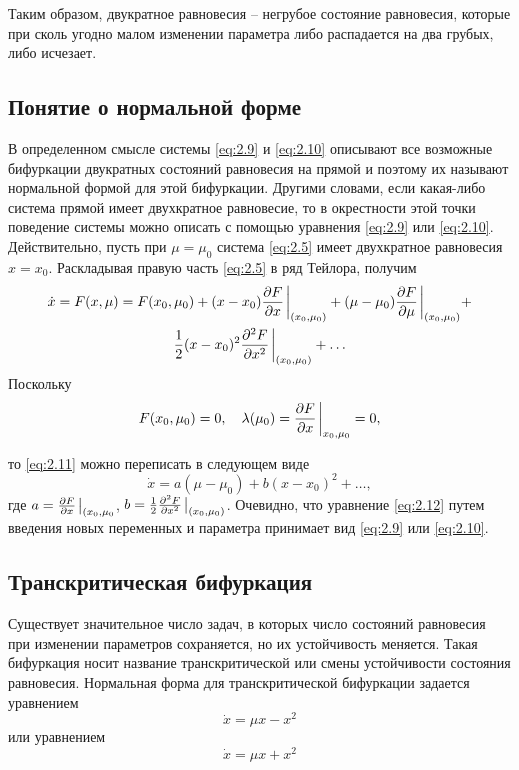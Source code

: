 Таким образом, двукратное равновесия -- негрубое состояние равновесия, которые при сколь угодно малом изменении параметра либо распадается на два грубых, либо исчезает.

\subsection{Понятие о нормальной форме} %

В определенном смысле системы \eqref{eq:2.9} и \eqref{eq:2.10} описывают все возможные бифуркации двукратных состояний равновесия на прямой и поэтому их называют нормальной формой для этой бифуркации. Другими словами, если какая-либо система прямой имеет двухкратное равновесие, то в окрестности этой точки поведение системы можно описать с помощью уравнения \eqref{eq:2.9} или \eqref{eq:2.10}. Действительно, пусть при $\mu = \mu_0$ система \eqref{eq:2.5} имеет двухкратное равновесия $x=x_0$. Раскладывая правую часть \eqref{eq:2.5} в ряд Тейлора, получим
\begin{gather}
	\dot x = F(x, \mu) = F(x_0, \mu_0)  + (x-x_0) \pdv{F}{x} \eval_{(x_0,\mu_0)} +
	(\mu- \mu_0)\pdv{F}{\mu} \eval_{(x_0,\mu_0)} + \\ 
	\frac12 (x-x_0)^2 \pdv[2]{F}{x} \eval_{(x_0,\mu_0)} + \dots
	\label{eq:2.11}
\end{gather}
Поскольку
\begin{equation}
	\label{eq:}
	F(x_0, \mu_0) = 0, \quad \lambda(\mu_0) = \pdv{F}{x}\eval_{x_0, \mu_0} = 0 ,
\end{equation}

 то \eqref{eq:2.11} можно переписать в следующем виде
 \begin{equation}
 	\label{eq:2.12}
 	\dot x = a(\mu - \mu_0) + b (x-x_0)^2 + \dots ,
 \end{equation}
 где $a = \pdv{F}{x}\eval_{(x_0, \mu_0} $, $b =\frac12 \pdv[2]{F}{x}\eval_{(x_0, \mu_0)}$.
 Очевидно, что уравнение \eqref{eq:2.12} путем введения новых переменных и параметра принимает вид \eqref{eq:2.9} или \eqref{eq:2.10}.
\subsection{Транскритическая бифуркация} %

Существует значительное число задач, в которых число состояний
равновесия при изменении параметров сохраняется, но их устойчивость
меняется. Такая бифуркация носит название транскритической или смены
устойчивости состояния равновесия. Нормальная форма для транскритической
бифуркации задается уравнением
\begin{equation}
	\label{eq:2.13}
	\dot x = \mu x -x^2
\end{equation}
или уравнением 
\begin{equation}
	\label{eq:2.14}
	\dot x = \mu x+ x^2	
\end{equation}


